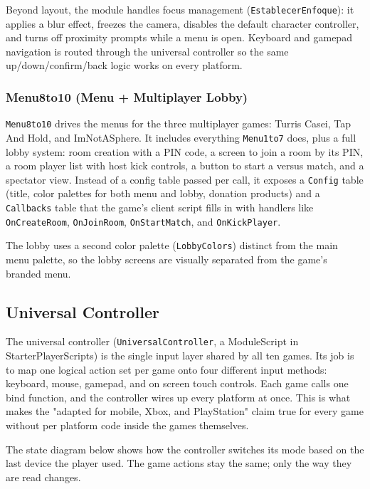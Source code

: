 \documentclass[12pt,letterpaper]{article}
\begin{document}
Beyond layout, the module handles focus management (\texttt{EstablecerEnfoque}): it applies a blur effect, freezes the camera, disables the default character controller, and turns off proximity prompts while a menu is open. Keyboard and gamepad navigation is routed through the universal controller so the same up/down/confirm/back logic works on every platform.

\subsubsection{Menu8to10 (Menu + Multiplayer Lobby)}

\texttt{Menu8to10} drives the menus for the three multiplayer games: Turris Casei, Tap And Hold, and ImNotASphere. It includes everything \texttt{Menu1to7} does, plus a full lobby system: room creation with a PIN code, a screen to join a room by its PIN, a room player list with host kick controls, a button to start a versus match, and a spectator view. Instead of a config table passed per call, it exposes a \texttt{Config} table (title, color palettes for both menu and lobby, donation products) and a \texttt{Callbacks} table that the game's client script fills in with handlers like \texttt{OnCreateRoom}, \texttt{OnJoinRoom}, \texttt{OnStartMatch}, and \texttt{OnKickPlayer}.

The lobby uses a second color palette (\texttt{LobbyColors}) distinct from the main menu palette, so the lobby screens are visually separated from the game's branded menu.

\subsection{Universal Controller}

The universal controller (\texttt{UniversalController}, a ModuleScript in StarterPlayerScripts) is the single input layer shared by all ten games. Its job is to map one logical action set per game onto four different input methods: keyboard, mouse, gamepad, and on screen touch controls. Each game calls one bind function, and the controller wires up every platform at once. This is what makes the "adapted for mobile, Xbox, and PlayStation" claim true for every game without per platform code inside the games themselves.

The state diagram below shows how the controller switches its mode based on the last device the player used. The game actions stay the same; only the way they are read changes.
\end{document}
